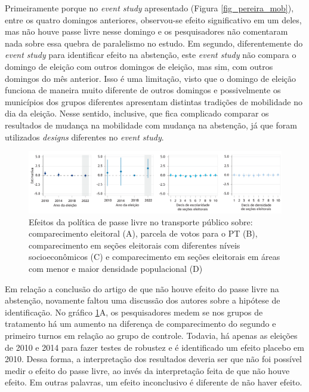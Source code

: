 Primeiramente porque no \textit{event study} apresentado (Figura \ref{fig_pereira_mob}), entre os quatro domingos anteriores, observou-se efeito significativo em um deles, mas não houve passe livre nesse domingo e os pesquisadores não comentaram nada sobre essa quebra de paralelismo no estudo. Em segundo, diferentemente do \textit{event study} para identificar efeito na abstenção, este \textit{event study} não compara o domingo de eleição com outros domingos de eleição, mas sim, com outros domingos do mês anterior. Isso é uma limitação, visto que o domingo de eleição funciona de maneira muito diferente de outros domingos e possivelmente os municípios dos grupos diferentes apresentam distintas tradições de mobilidade no dia da eleição. Nesse sentido, inclusive, que fica complicado comparar os resultados de mudança na mobilidade com mudança na abstenção, já que foram utilizados \textit{designs} diferentes no \textit{event study}.

\begin{figure}[!ht]
    \includegraphics[width = \linewidth]{relatorios/passe-livre/graficos/pereira_abst.png}
    \caption{Efeitos da política de passe livre no transporte público sobre: comparecimento eleitoral
(A), parcela de votos para o PT (B), comparecimento em seções eleitorais com diferentes
níveis socioeconômicos (C) e comparecimento em seções eleitorais em áreas com menor
e maior densidade populacional (D)}
    \label{fig_pereira_abst}
\end{figure}

Em relação a conclusão do artigo de que não houve efeito do passe livre na abstenção, novamente faltou uma discussão dos autores sobre a hipótese de identificação. No gráfico \ref{fig_pereira_abst}A, os pesquisadores medem se nos grupos de tratamento há um aumento na diferença de comparecimento do segundo e primeiro turnos em relação ao grupo de controle. Todavia, há apenas as eleições de 2010 e 2014 para fazer testes de robustez e é identificado um efeito placebo em 2010. Dessa forma, a interpretação dos resultados deveria ser que não foi possível medir o efeito do passe livre, ao invés da interpretação feita de que não houve efeito. Em outras palavras, um efeito inconclusivo é diferente de não haver efeito.

